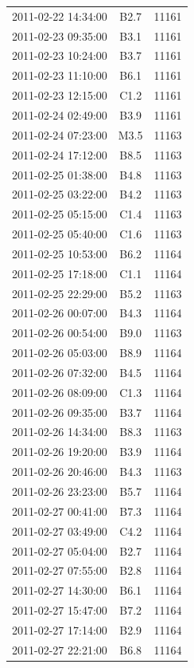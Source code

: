 \documentclass[referee,a4paper,12pt]{swsc}
\begin{document}
\begin{linenumbers}
\begin{longtable}{c|c|c}
		2011-02-22 14:34:00 & B2.7 & 11161 \\ 
		2011-02-23 09:35:00 & B3.1 & 11161 \\ 
		2011-02-23 10:24:00 & B3.7 & 11161 \\ 
		2011-02-23 11:10:00 & B6.1 & 11161 \\ 
		2011-02-23 12:15:00 & C1.2 & 11161 \\ 
		2011-02-24 02:49:00 & B3.9 & 11161 \\ 
		2011-02-24 07:23:00 & M3.5 & 11163 \\ 
		2011-02-24 17:12:00 & B8.5 & 11163 \\ 
		2011-02-25 01:38:00 & B4.8 & 11163 \\ 
		2011-02-25 03:22:00 & B4.2 & 11163 \\ 
		2011-02-25 05:15:00 & C1.4 & 11163 \\ 
		2011-02-25 05:40:00 & C1.6 & 11163 \\ 
		2011-02-25 10:53:00 & B6.2 & 11164 \\ 
		2011-02-25 17:18:00 & C1.1 & 11164 \\ 
		2011-02-25 22:29:00 & B5.2 & 11163 \\ 
		2011-02-26 00:07:00 & B4.3 & 11164 \\ 
		2011-02-26 00:54:00 & B9.0 & 11163 \\ 
		2011-02-26 05:03:00 & B8.9 & 11164 \\ 
		2011-02-26 07:32:00 & B4.5 & 11164 \\ 
		2011-02-26 08:09:00 & C1.3 & 11164 \\ 
		2011-02-26 09:35:00 & B3.7 & 11164 \\ 
		2011-02-26 14:34:00 & B8.3 & 11163 \\ 
		2011-02-26 19:20:00 & B3.9 & 11164 \\ 
		2011-02-26 20:46:00 & B4.3 & 11163 \\ 
		2011-02-26 23:23:00 & B5.7 & 11164 \\ 
		2011-02-27 00:41:00 & B7.3 & 11164 \\ 
		2011-02-27 03:49:00 & C4.2 & 11164 \\ 
		2011-02-27 05:04:00 & B2.7 & 11164 \\ 
		2011-02-27 07:55:00 & B2.8 & 11164 \\ 
		2011-02-27 14:30:00 & B6.1 & 11164 \\ 
		2011-02-27 15:47:00 & B7.2 & 11164 \\ 
		2011-02-27 17:14:00 & B2.9 & 11164 \\ 
		2011-02-27 22:21:00 & B6.8 & 11164 \\ 

\end{longtable}
\end{linenumbers}
\end{document}
